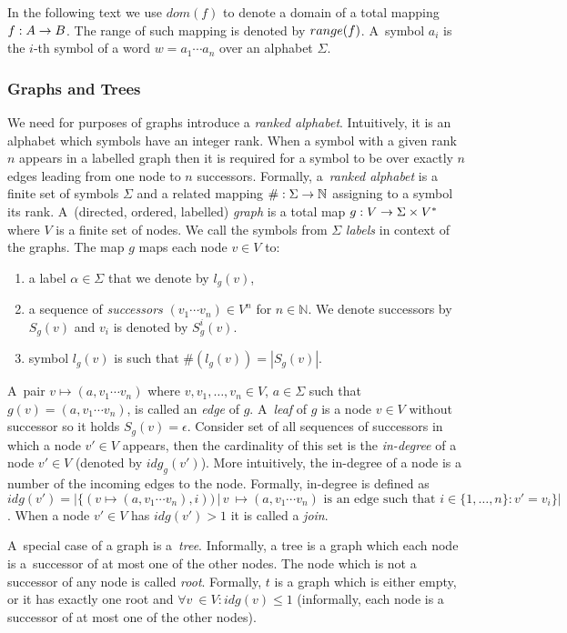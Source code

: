 \documentclass[a4paper, 12pt]{article}
\begin{document}
In the following text we use $dom(f)$ to denote a domain of a total mapping $f: A \rightarrow B$.
The range of such mapping is denoted by $range(f)$.
A~symbol $a_i$ is the $i$-th symbol of a word $w = a_1 \cdots a_n$ over an alphabet $\Sigma$.

\subsubsection{Graphs and Trees}
\label{subsec:graph}
We need for purposes of graphs introduce a \emph{ranked alphabet}.
Intuitively, it is an alphabet which symbols have an integer rank.
When a symbol with a given rank $n$ appears in a labelled graph
then it is required for a symbol to be over exactly $n$ edges
leading from one node to $n$ successors.
Formally, a~\emph{ranked alphabet} is a finite set of symbols $\Sigma$
and a related mapping $\#: \Sigma \rightarrow \mathbb{N}$ assigning to a symbol its rank.
A~(directed, ordered, labelled) \emph{graph} is a total map $g: V \rightarrow \Sigma \times V^{*}$ where $V$ is a finite set of nodes.
We call the symbols from $\Sigma$ \emph{labels} in context of the graphs.
The map $g$ maps each node $v\in V$ to:
\begin{enumerate}
	\item a label $\alpha \in \Sigma$ that we denote by $l_g(v)$,
	\item a sequence of \emph{successors} $(v_1 \cdots v_n) \in V^n$ for $n \in \mathbb{N}$.
		We denote successors by $S_g(v)$ and $v_i$ is denoted by $S^i_g(v)$.
	\item symbol $l_g(v)$ is such that $\#(l_g(v)) = |S_g(v)|$.
\end{enumerate}

A~pair $v \mapsto (a, v_1 \cdots v_n)$ where $v, v_1, \ldots, v_n \in V$,
$a \in \Sigma$ such that $g(v) = (a, v_1 \cdots v_n)$, is called an \emph{edge} of $g$.
A~\emph{leaf} of $g$ is a node $v \in V$ without successor so it holds $S_g(v) = \epsilon$.
Consider set of all sequences of successors in which a node $v' \in V$ appears, then
the cardinality of this set is the \emph{in-degree} of a node $v' \in V$ (denoted by $idg_g(v')$).
More intuitively, the in-degree of a node is a number of the incoming edges to the node.
Formally, in-degree is defined as
$idg(v') = |\{(v \mapsto (a, v_1 \cdots v_n),i)) \,|\, v~\mapsto (a, v_1 \cdots v_n)
\text{ is an edge such that } i \in \{1,\ldots,n\}: v' = v_i\}|$.
When a node $v' \in V$ has $idg(v') > 1$ it is called a \emph{join}.

A~special case of a graph is a~\emph{tree}.
Informally, a tree is a graph which each node is
a~successor of at most one of the other nodes.
The node which is not a successor of any node is called \emph{root}.
Formally, $t$ is a graph which is either empty, or it has exactly one root and $\forall v~\in V: idg(v) \leq 1$ (informally,
each node is a successor of at most one of the other nodes).
\end{document}
